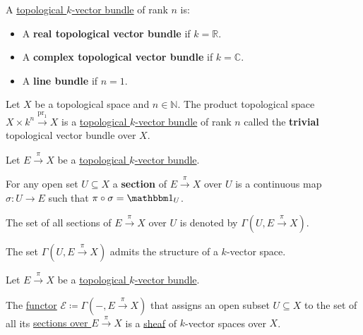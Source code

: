 \documentclass[../../../main]{subfiles}
\begin{document}
\begin{notation}
  A \hyperref[def:topological-vector-bundle]{topological \(k\)-vector bundle} of rank \(n\) is:
  \begin{itemize}
    \item A \textbf{real topological vector bundle} if \(k = \mathbb{R}\).
    \item A \textbf{complex topological vector bundle} if \(k = \mathbb{C}\).
    \item A \textbf{line bundle} if \(n = 1\).
  \end{itemize}
\end{notation}


\begin{example} \label{ex:trivial-topological-vector-bundle}
  Let \(X\) be a topological space and \(n \in \mathbb{N}\).
  The product topological space \(X \times k^{n} \xrightarrow{\operatorname{pr}_{1}} X\) is a \hyperref[def:topological-vector-bundle]{topological \(k\)-vector bundle} of rank \(n\) called the \textbf{trivial} topological vector bundle over \(X\).
\end{example}


\begin{example}
\end{example}

\begin{definition} \label{def:section-topological-vector-bundle}
  Let \(E \xrightarrow{\pi} X\) be a \hyperref[def:topological-vector-bundle]{topological \(k\)-vector bundle}.

  For any open set \(U \subseteq X\) a \textbf{section} of \(E \xrightarrow{\pi} X\) over \(U\) is a continuous map \(\sigma: U \to E\) such that \(\pi \circ \sigma = \id_{U}\).

  The set of all sections of \(E \xrightarrow{\pi} X\) over \(U\) is denoted by \(\Gamma(U, E \xrightarrow{\pi} X)\).
\end{definition}
\begin{remark}
  The set \(\Gamma(U, E \xrightarrow{\pi} X)\) admits the structure of a \(k\)-vector space.
\end{remark}


\begin{lemma}
  Let \(E \xrightarrow{\pi} X\) be a \hyperref[def:topological-vector-bundle]{topological \(k\)-vector bundle}.

  The \hyperref[def:functor]{functor} \(\mathcal{E} \coloneq \Gamma(-, E \xrightarrow{\pi} X)\) that assigns an open subset \(U \subseteq X\) to the set of all its \hyperref[def:section-topological-vector-bundle]{sections over \(E \xrightarrow{\pi} X\)} is a \hyperref[def:sheaf]{sheaf} of \(k\)-vector spaces over \(X\).
\end{lemma}
\end{document}
